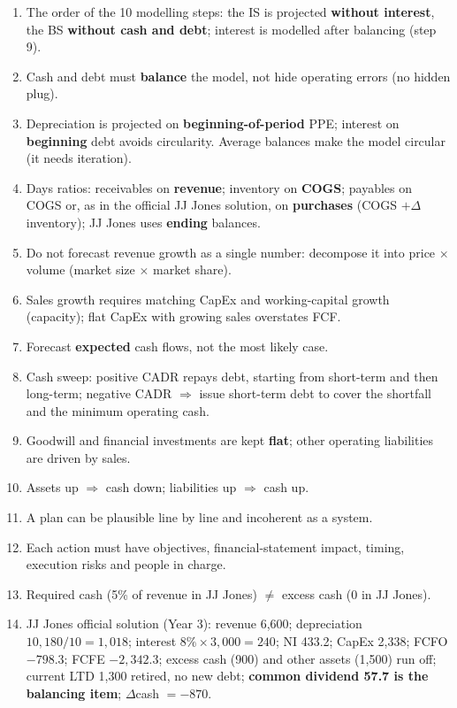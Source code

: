 \begin{trapbox}
\begin{enumerate}[leftmargin=*]
  \item The order of the 10 modelling steps: the IS is projected \textbf{without interest}, the BS \textbf{without cash and debt}; interest is modelled after balancing (step 9).
  \item Cash and debt must \textbf{balance} the model, not hide operating errors (no hidden plug).
  \item Depreciation is projected on \textbf{beginning-of-period} PPE; interest on \textbf{beginning} debt avoids circularity. Average balances make the model circular (it needs iteration).
  \item Days ratios: receivables on \textbf{revenue}; inventory on \textbf{COGS}; payables on COGS or, as in the official JJ Jones solution, on \textbf{purchases} (COGS $+\Delta$inventory); JJ Jones uses \textbf{ending} balances.
  \item Do not forecast revenue growth as a single number: decompose it into price $\times$ volume (market size $\times$ market share).
  \item Sales growth requires matching CapEx and working-capital growth (capacity); flat CapEx with growing sales overstates FCF.
  \item Forecast \textbf{expected} cash flows, not the most likely case.
  \item Cash sweep: positive CADR repays debt, starting from short-term and then long-term; negative CADR $\Rightarrow$ issue short-term debt to cover the shortfall and the minimum operating cash.
  \item Goodwill and financial investments are kept \textbf{flat}; other operating liabilities are driven by sales.
  \item Assets up $\Rightarrow$ cash down; liabilities up $\Rightarrow$ cash up.
  \item A plan can be plausible line by line and incoherent as a system.
  \item Each action must have objectives, financial-statement impact, timing, execution risks and people in charge.
  \item Required cash (5\% of revenue in JJ Jones) $\neq$ excess cash (0 in JJ Jones).
  \item JJ Jones official solution (Year 3): revenue 6,600; depreciation $10{,}180/10=1{,}018$; interest $8\%\times3{,}000=240$; NI 433.2; CapEx 2,338; FCFO $-798.3$; FCFE $-2{,}342.3$; excess cash (900) and other assets (1,500) run off; current LTD 1,300 retired, no new debt; \textbf{common dividend 57.7 is the balancing item}; $\Delta$cash $=-870$.

\end{enumerate}
\end{trapbox}
